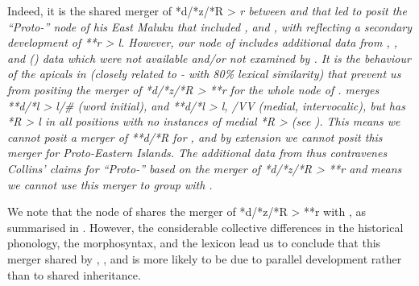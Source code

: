 Indeed, it is the shared merger of *d/*z/*R > \it{r} between
 and  that led \citet[131ff]{Collins1986} to posit the “Proto-”
node of his East  Maluku that included ,
 and , with  reflecting a secondary development
of **r > \it{l}.
However, our  node of 
includes additional data from ,
, and  () data which were not available
and/or not examined by \citet{Collins1986}.
It is the behaviour of the apicals in  (closely related to
- with 80{\%} lexical similarity) that prevent us from
positing the merger of *d/*z/*R > **r for the whole  node of .
 merges **d/*l > \it{l}/{\#}{\gap} (word initial),
and **d/*l > \it{l},
{\0} /V{\gap}V (medial, intervocalic),
but has *R > \it{l} in all positions with no instances of medial
*R > {\0} (see ).
This means we cannot posit a merger of **d/*R for ,
and by extension we cannot posit this merger for Proto-Eastern Islands.
The additional data from  thus contravenes Collins’ claims
for “Proto-” based on the merger of *d/*z/*R > **r
and means we cannot use this merger to group  with .

We note that the  node of 
shares the merger of *d/*z/*R > **r with ,
as summarised in .
However, the considerable collective differences in the historical
phonology, the morphosyntax, and the lexicon lead us to conclude that this
merger shared by ,
, and  is more likely to be due to parallel
development rather than to shared inheritance.

